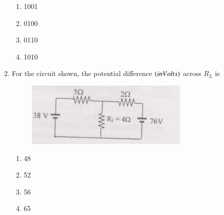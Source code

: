 \documentclass[journal]{IEEEtran}
\numberwithin{equation}{enumi}
\numberwithin{figure}{enumi}
\begin{document}
\begin{enumerate}
		\begin{enumerate}
			\item 1001
			\item 0100
			\item 0110
			\item 1010
		\end{enumerate}
	\item For the circuit shown, the potential difference $\left(in Volts\right)$ across $R_L$ is
		\begin{figure}[H]
                        \centering
                        \includegraphics[width=0.4\linewidth]{figs/fig6.png}
                        \caption{}
                        \label{graph}
                \end{figure}
		\begin{enumerate}
			\item 48
			\item 52
			\item 56
			\item 65
		\end{enumerate}

\end{enumerate}
\end{document}
